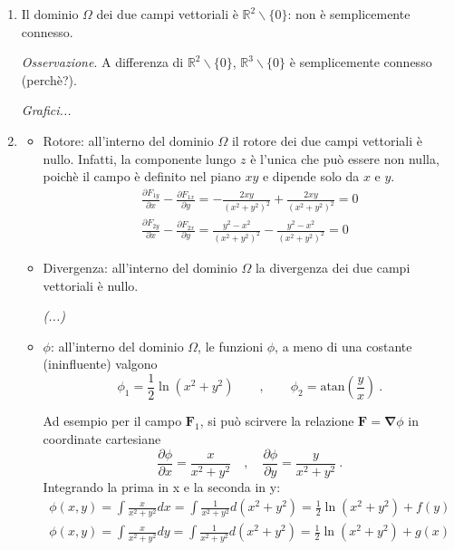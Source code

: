 \begin{enumerate}

\item Il dominio $\Omega$ dei due campi vettoriali è $\mathbb{R}^2\backslash\{ 0 \}$: non è semplicemente connesso.

  \textit{Osservazione}. A differenza di $\mathbb{R}^2\backslash\{ 0 \}$, $\mathbb{R}^3\backslash\{ 0 \}$ 
    è semplicemente connesso (perchè?).

  \textit{Grafici...}

\item 

\begin{itemize}

\item{Rotore}:
all'interno del dominio $\Omega$ il rotore dei due campi vettoriali è nullo. 
Infatti, la componente lungo $z$ è l'unica che può essere non nulla, poichè il campo è definito nel piano $xy$ e dipende solo da $x$ e $y$.
\begin{equation}
\begin{aligned}
  \frac{\partial F_{1y}}{\partial x} - \frac{\partial F_{1x}}{\partial y} = -\frac{2xy}{(x^2+y^2)^2} + \frac{2xy}{(x^2+y^2)^2} = 0 \\
  \frac{\partial F_{2y}}{\partial x} - \frac{\partial F_{2x}}{\partial y} =  \frac{y^2-x^2}{(x^2+y^2)^2} - \frac{y^2-x^2}{(x^2+y^2)^2} = 0 
\end{aligned}
\end{equation}

\item{Divergenza}:
all'interno del dominio $\Omega$ la divergenza dei due campi vettoriali è nullo. 

\textit{(...)}

\item{$\phi$}:
all'interno del dominio $\Omega$, le funzioni $\phi$, a meno 
di una costante (ininfluente) valgono
\begin{equation}
 \phi_1 = \frac{1}{2} \ln(x^2 + y^2) \qquad , \qquad \phi_2 = \text{atan} \displaystyle\left(\frac{y}{x}\right) \ .
\end{equation}

Ad esempio per il campo $\bm{F}_1$, si può scirvere la relazione $\bm{F} = \bm{\nabla}\phi$ in coordinate cartesiane
\begin{equation}
  \frac{\partial \phi}{\partial x} = \frac{x}{x^2+y^2} \quad , \quad
  \frac{\partial \phi}{\partial y} = \frac{y}{x^2+y^2} \ . 
\end{equation}
Integrando la prima in x e la seconda in y:
\begin{equation}
\begin{aligned}
  \phi(x,y) = \int \frac{x}{x^2+y^2} dx = \int \frac{1}{x^2+y^2}d(x^2+y^2) = \frac{1}{2} \ln (x^2+y^2) + f(y) \\
  \phi(x,y) = \int \frac{x}{x^2+y^2} dy = \int \frac{1}{x^2+y^2}d(x^2+y^2) = \frac{1}{2} \ln (x^2+y^2) + g(x) \\ 
\end{aligned}
\end{equation}


\end{itemize}
\end{enumerate}
